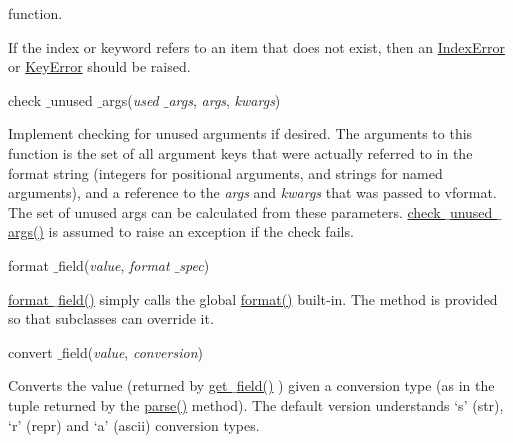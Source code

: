 \documentclass[a4paper,12pt]{report}
\begin{document}
 function. \par
If the index or keyword refers to an item that does not exist, then an \href{https://docs.python.org/2/library/exceptions.html}{IndexError}
 or \href{https://docs.python.org/2/library/exceptions.html}{KeyError}
 should be raised. \par
check $  \_  $unused $  \_  $args(\emph{used $  \_  $args}, \emph{args}, \emph{kwargs}) \par
Implement checking for unused arguments if desired. The arguments to this function is the set of all argument keys that were actually referred to in the format string (integers for positional arguments, and strings for named arguments), and a reference to the \emph{args} and \emph{kwargs} that was passed to vformat. The set of unused args can be calculated from these parameters. \href{https://docs.python.org/2/library/string.html}{check $  \_  $unused $  \_  $args()}
 is assumed to raise an exception if the check fails. \par
format $  \_  $field(\emph{value}, \emph{format $  \_  $spec}) \par
\href{https://docs.python.org/2/library/string.html}{format $  \_  $field()}
 simply calls the global \href{https://docs.python.org/2/library/functions.html}{format()}
 built-in. The method is provided so that subclasses can override it. \par
convert $  \_  $field(\emph{value}, \emph{conversion}) \par
Converts the value (returned by \href{https://docs.python.org/2/library/string.html}{get $  \_  $field()}
) given a conversion type (as in the tuple returned by the \href{https://docs.python.org/2/library/string.html}{parse()}
 method). The default version understands ‘s’ (str), ‘r’ (repr) and ‘a’ (ascii) conversion types. \par
\noindent 
\end{document}
